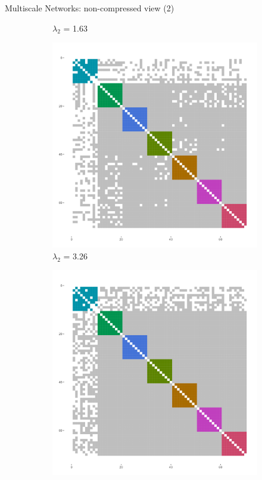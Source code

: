\documentclass[11pt]{beamer}
\begin{document}
\begin{frame}{Multiscale Networks: non-compressed view (2)}
\begin{figure}
\begin{subfigure}{0.4\linewidth}
\caption{$\lambda_2$ = 1.63}
\end{subfigure}
\hfill
\begin{subfigure}{0.3\linewidth}
\centering
\includegraphics[scale = 0.14]{images/colored-adj_mat_mglasso_genot3_order_omic.png}
\caption{$\lambda_2$ = 3.26}
\end{subfigure}
\begin{subfigure}{0.3\linewidth}
\centering
\includegraphics[scale = 0.14]{images/colored-adj_mat_mglasso_genot4_order_omic.png}

\end{subfigure}
\end{figure}
\end{frame}
\end{document}
